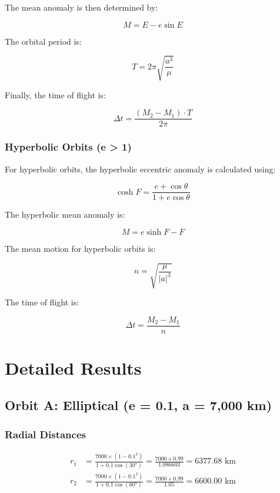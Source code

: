 \documentclass[12pt,a4paper]{article}
\begin{document}
The mean anomaly is then determined by:

\begin{equation}
M = E - e\sin E
\end{equation}

The orbital period is:

\begin{equation}
T = 2\pi\sqrt{\frac{a^3}{\mu}}
\end{equation}

Finally, the time of flight is:

\begin{equation}
\Delta t = \frac{(M_2 - M_1) \cdot T}{2\pi}
\end{equation}

\subsubsection{Hyperbolic Orbits (e > 1)}

For hyperbolic orbits, the hyperbolic eccentric anomaly is calculated using:

\begin{equation}
\cosh F = \frac{e + \cos\theta}{1 + e\cos\theta}
\end{equation}

The hyperbolic mean anomaly is:

\begin{equation}
M = e\sinh F - F
\end{equation}

The mean motion for hyperbolic orbits is:

\begin{equation}
n = \sqrt{\frac{\mu}{|a|^3}}
\end{equation}

The time of flight is:

\begin{equation}
\Delta t = \frac{M_2 - M_1}{n}
\end{equation}

\section{Detailed Results}

\subsection{Orbit A: Elliptical (e = 0.1, a = 7,000 km)}

\subsubsection{Radial Distances}
\begin{align}
r_1 &= \frac{7000 \times (1-0.1^2)}{1+0.1\cos(30°)} = \frac{7000 \times 0.99}{1.086603} = 6377.68 \text{ km} \\
r_2 &= \frac{7000 \times (1-0.1^2)}{1+0.1\cos(60°)} = \frac{7000 \times 0.99}{1.05} = 6600.00 \text{ km}
\end{align}
\end{document}

